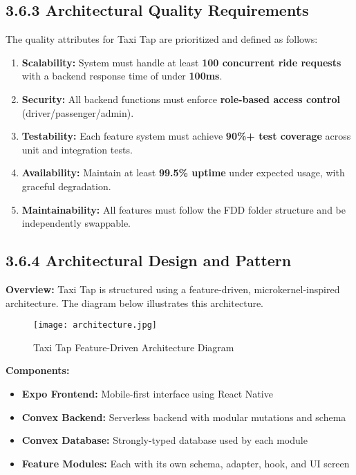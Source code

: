 \documentclass[12pt]{article}
\begin{document}
\subsection{3.6.3 Architectural Quality Requirements}
The quality attributes for Taxi Tap are prioritized and defined as follows:

\begin{enumerate}
  \item \textbf{Scalability:} System must handle at least \textbf{100 concurrent ride requests} with a backend response time of under \textbf{100ms}.
  \item \textbf{Security:} All backend functions must enforce \textbf{role-based access control} (driver/passenger/admin).
  \item \textbf{Testability:} Each feature system must achieve \textbf{90\%+ test coverage} across unit and integration tests.
  \item \textbf{Availability:} Maintain at least \textbf{99.5\% uptime} under expected usage, with graceful degradation.
  \item \textbf{Maintainability:} All features must follow the FDD folder structure and be independently swappable.
\end{enumerate}

\subsection{3.6.4 Architectural Design and Pattern}
\textbf{Overview:} Taxi Tap is structured using a feature-driven, microkernel-inspired architecture. The diagram below illustrates this architecture.

\vspace{1em}
\begin{figure}[H]
  \centering
  \texttt{[image: architecture.jpg]}
  \caption{Taxi Tap Feature-Driven Architecture Diagram}
  \label{fig:architecture}
\end{figure}
\vspace{1em}

\textbf{Components:}

\begin{itemize}
  \item \textbf{Expo Frontend:} Mobile-first interface using React Native
  \item \textbf{Convex Backend:} Serverless backend with modular mutations and schema
  \item \textbf{Convex Database:} Strongly-typed database used by each module
  \item \textbf{Feature Modules:} Each with its own schema, adapter, hook, and UI screen
\end{itemize}
\end{document}
